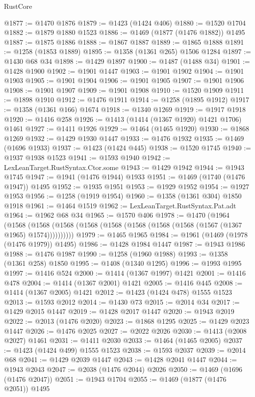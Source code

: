 \begin{lexlean}{RustCore}
\begin{coremodule}
@1877 := @1470 @1876
@1879 := @1423 (@1424 @406)
@1880 := @1520 @1704
@1882 := @1879 @1880 @1523
@1886 := @1469 (@1877 (@1476 @1882)) @1495
@1887 := @1875 @1886
@1888 := @1867 @1887
@1889 := @1865 @1888
@1891 := @1258 (@1853 @1889)
@1895 := @1358 (@1361 @265) @1506 @1284
@1897 := @1430 @68 @34
@1898 := @1429 @1897
@1900 := @1487 (@1488 @34)
@1901 := @1428 @1900
@1902 := @1901 @1447
@1903 := @1901 @1902
@1904 := @1901 @1903
@1905 := @1901 @1904
@1906 := @1901 @1905
@1907 := @1901 @1906
@1908 := @1901 @1907
@1909 := @1901 @1908
@1910 := @1520 @1909
@1911 := @1898 @1910
@1912 := @1476 @1911
@1914 := @1258 (@1895 @1912)
@1917 := @1358 (@1361 @166) @1674
@1918 := @1340 @1269
@1919 := @1917 @1918
@1920 := @1416 @258
@1926 := @1413 (@1414 (@1367 @1920) @1421 @1706) @1461
@1927 := @1411 @1926
@1929 := @1464 (@1465 @1920)
@1930 := @1868 @1269
@1932 := @1429 @1930 @1447
@1933 := @1476 @1932
@1935 := @1469 (@1696 @1933)
@1937 := @1423 (@1424 @445)
@1938 := @1520 @1745
@1940 := @1937 @1938 @1523
@1941 := @1593 @1940
@1942 := LexLeanTarget.RustSyntax.Ctor.some
@1943 := @1429 @1942
@1944 := @1943 @1745
@1947 := @1941 (@1476 @1944) @1933
@1951 := @1469 (@1740 (@1476 @1947)) @1495
@1952 := @1935 @1951
@1953 := @1929 @1952
@1954 := @1927 @1953
@1956 := @1258 (@1919 @1954)
@1960 := @1358 (@1361 @304) @1850 @1918
@1961 := @1464 @1519
@1962 := LexLeanTarget.RustSyntax.Pat.adt
@1964 := @1962 @68 @34
@1965 := @1570 @406
@1978 := @1470
    (@1964
      (@1568 (@1568 (@1568 (@1568 (@1568 (@1568 (@1568 (@1568 (@1567 (@1367 @1965) @1574))))))))))
@1979 := @1465 @1965
@1984 := @1961 (@1469 (@1978 (@1476 @1979)) @1495)
@1986 := @1428 @1984 @1447
@1987 := @1943 @1986
@1988 := @1476 @1987
@1990 := @1258 (@1960 @1988)
@1993 := @1358 (@1361 @258) @1850
@1995 := @1408 (@1340 @1295)
@1996 := @1993 @1995
@1997 := @1416 @524
@2000 := @1414 (@1367 @1997) @1421
@2001 := @1416 @478
@2004 := @1414 (@1367 @2001) @1421
@2005 := @1416 @445
@2008 := @1414 (@1367 @2005) @1421
@2012 := @1423 (@1424 @478) @1555 @1523
@2013 := @1593 @2012
@2014 := @1430 @73
@2015 := @2014 @34
@2017 := @1429 @2015 @1447
@2019 := @1428 @2017 @1447
@2020 := @1943 @2019
@2022 := @2013 (@1476 @2020)
@2023 := @1868 @1295
@2025 := @1429 @2023 @1447
@2026 := @1476 @2025
@2027 := @2022 @2026
@2030 := @1413 (@2008 @2027) @1461
@2031 := @1411 @2030
@2033 := @1464 (@1465 @2005)
@2037 := @1423 (@1424 @499) @1555 @1523
@2038 := @1593 @2037
@2039 := @2014 @68
@2041 := @1429 @2039 @1447
@2043 := @1428 @2041 @1447
@2044 := @1943 @2043
@2047 := @2038 (@1476 @2044) @2026
@2050 := @1469 (@1696 (@1476 @2047))
@2051 := @1943 @1704
@2055 := @1469 (@1877 (@1476 @2051)) @1495

\end{coremodule}
\end{lexlean}
